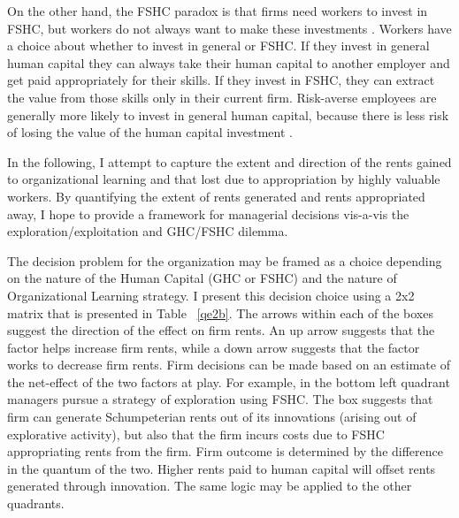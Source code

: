 \documentclass[12pt,letterpaper]{article}
\begin{document}
On the other hand, the FSHC paradox is that firms need workers to invest in FSHC, but workers do not always want to make these investments \citep{Wang2006}. Workers have a choice about whether to invest in general or FSHC. If they invest in general human capital they can always take their human capital to another employer and get paid appropriately for their skills. If they invest in FSHC, they can extract the value from those skills only in their current firm. Risk-averse employees are generally more likely to invest in general human capital, because there is less risk of losing the value of the human capital investment \citep{Wang2006}. 

In the following, I attempt to capture the extent and direction of the rents gained to organizational learning and that lost due to appropriation by highly valuable workers. By quantifying the extent of rents generated and rents appropriated away, I hope to provide a framework for managerial decisions vis-a-vis the exploration/exploitation and GHC/FSHC dilemma.

The decision problem for the organization may be framed as a choice depending on the nature of the Human Capital (GHC or FSHC) and the nature of Organizational Learning strategy. I present this decision choice using a 2x2 matrix that is presented in Table ~\ref{qe2b}. The arrows within each of the boxes suggest the direction of the effect on firm rents. An up arrow suggests that the factor helps increase firm rents, while a down arrow suggests that the factor works to decrease firm rents. Firm decisions can be made based on an estimate of the net-effect of the two factors at play. For example, in the bottom left quadrant managers pursue a strategy of exploration using FSHC. The box suggests that firm can generate Schumpeterian rents out of its innovations (arising out of explorative activity), but also that the firm incurs costs due to FSHC appropriating rents from the firm. Firm outcome is determined by the difference in the quantum of the two. Higher rents paid to human capital will offset rents generated through innovation. The same logic may be applied to the other quadrants.
\end{document}
